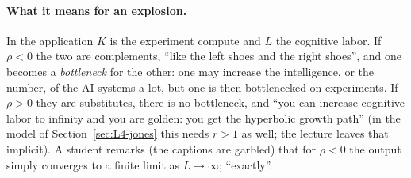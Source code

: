 \paragraph{What it means for an explosion.}
In the application $K$ is the experiment compute and $L$ the cognitive labor. If $\rho<0$ the two are complements, ``like the left shoes and the right shoes'', and one becomes a \emph{bottleneck} for the other: one may increase the intelligence, or the number, of the AI systems a lot, but one is then bottlenecked on experiments. If $\rho>0$ they are substitutes, there is no bottleneck, and ``you can increase cognitive labor to infinity and you are golden: you get the hyperbolic growth path'' (in the model of Section~\ref{sec:L4-jones} this needs $r>1$ as well; the lecture leaves that implicit). A student remarks (the captions are garbled\flag) that for $\rho<0$ the output simply converges to a finite limit as $L\to\infty$; ``exactly''.

